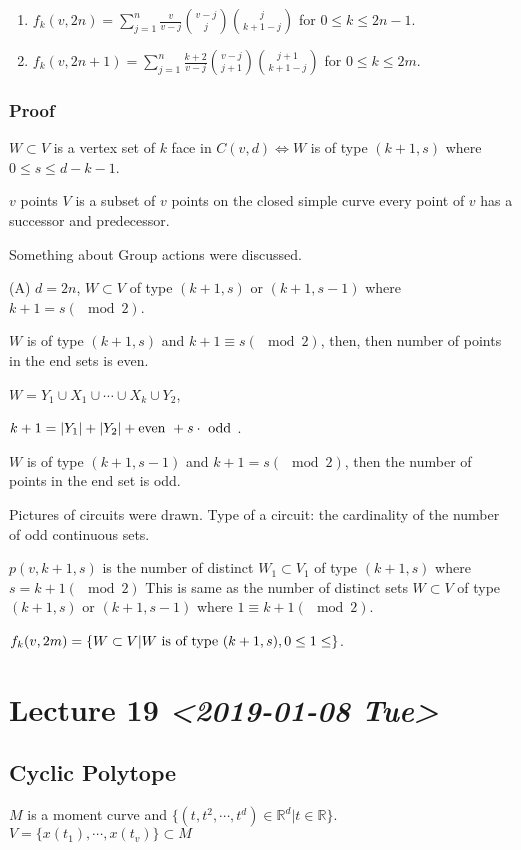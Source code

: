 \documentclass[11pt]{article}
\def\R{\mathbb{R}}
\begin{document}
{{\begin{enumerate}
\item \(f_k(v, 2n) = \sum_{j = 1}^{n} \frac{v}{v-j} \binom{v-j}{j} \binom{j}{k+1
      -j}\) for \(0 \le k \le 2n -1\).
\item \(f_k(v, 2n + 1) = \sum_{j = 1}^{n} \frac{k+2}{v-j} \binom{v - j}{j+1}
      \binom{j+1}{k+1-j}\) for \(0 \le k \le 2m\).
\end{enumerate}
\subsubsection{Proof}
\label{sec:orgb7122ce}
\(W \subset V\) is a vertex set of \(k\) face in \(C(v, d) \iff W\) is of type
\((k+1, s)\) where \(0 \le s \le d - k - 1\).

\(v\) points \(V\) is a subset of \(v\) points on the closed simple curve every
point of \(v\) has a successor and predecessor.

Something about Group actions were discussed.

(A) \(d = 2n\), \(W \subset V\) of type \((k+1, s)\) or \((k+1, s - 1)\) where \(k +
    1= s(\mod 2)\).

\(W\) is of type \((k+1, s)\) and \(k+1 \equiv s (\mod 2)\), then, then number of
points in the end sets is even.

\(W = Y_1 \cup X_1 \cup \cdots \cup X_k \cup Y_2\),

\(k+1 = \vert Y_1 \vert + \vert Y_2 \vert + \textup{even } + s\cdot \textup{
    odd }\).

\(W\) is of type \((k+1, s- 1)\) and \(k+1 = s (\mod 2)\), then the number of
points in the end set is odd.

Pictures of circuits were drawn. Type of a circuit: the cardinality of the
number of odd continuous sets.

\(p(v, k+1, s)\) is the number of distinct \(W_1 \subset V_1\) of type \((k+1,
    s)\) where \(s = k + 1 (\mod 2)\) This is same as the number of distinct sets
\(W \subset V\) of type \((k+1, s)\) or \((k+1, s-1)\) where \(1 \equiv k + 1
    (\mod 2)\).

\(f_k(v, 2m) = \{W \subset V \vert W \textup{ is of type } (k+1, s), 0 \le 1
    \le \}\).
\section{Lecture 19 \textit{<2019-01-08 Tue>}}
\label{sec:org8e2e3fc}
\subsection{Cyclic Polytope}
\label{sec:org80eeb27}
\(M\) is a moment curve and \(\{(t, t^2, \cdots, t^d) \in \R^d \vert t\in \R\}\).
\(V = \{x(t_1), \cdots, x(t_v) \} \subset M\)

}}
\end{document}
